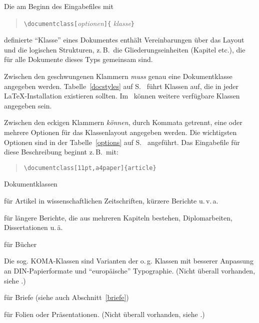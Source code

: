 Die am Beginn des Eingabefiles  mit
\begin{verse}
\verb|\documentclass[|\textit{optionen}\verb|]{|%
  \textit{klasse}\verb|}|
\end{verse}
definierte "`Klasse"' eines Dokumentes enthält 
Vereinbarungen über 
das Layout und die logischen Strukturen, z.\,B.\ die 
Gliederungseinheiten (Kapitel etc.\@), 
die für alle Dokumente dieses Typs gemeinsam sind.

Zwischen den geschwungenen Klammern \emph{muss} genau eine Dokumentklasse
angegeben werden.  Tabelle~\ref{docstyles} auf S.~\pageref{docstyles}
führt Klassen auf,
die in jeder \LaTeX-Installation existieren sollten.  
Im \local\ können weitere verfügbare 
Klassen angegeben sein.  
 
Zwischen den eckigen Klammern \emph{können}, durch Kommata getrennt, 
eine oder mehrere Optionen für das Klassenlayout
angegeben werden. Die wichtigsten Optionen sind in der 
Tabelle~\ref{options} auf S.~\pageref{options} angeführt.
Das Eingabefile für diese Beschreibung beginnt z.\,B.\ mit:
\begin{verse}
\verb|\documentclass[11pt,a4paper]{article}|
\end{verse}

\begin{table}[hbpt]
\caption{Dokumentklassen} \label{docstyles}
\begin{lminipage}{11cm}
\begin{ttdescription}%
\item [article] für Artikel in wissenschaftlichen Zeitschriften,
  kürzere Berichte u.\,v.\,a.
 
\item [report] für längere Berichte, die aus mehreren Kapiteln
  bestehen, Diplomarbeiten, Dissertationen u.\,ä.
 
\item [book] für Bücher

\item[scrartcl, scrreprt, scrbook]\quad Die sog. KOMA-Klassen 
sind Varianten der o.\,g. Klassen
mit besserer Anpassung an DIN-Papierformate und "`europäische"'
Typographie. 
(Nicht überall vorhanden, siehe \local.)


\item [letter] für Briefe (siehe auch Abschnitt~\ref{briefe})

\item [foils] für Folien oder Präsentationen.
(Nicht überall vorhanden, siehe \local.)
  
\end{ttdescription}
\end{lminipage}
\end{table}

